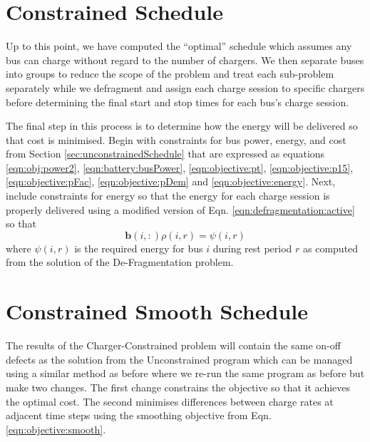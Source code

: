 \section{Constrained Schedule\label{sec:constrainedSchedule}}
Up to this point, we have computed the ``optimal'' schedule which assumes any bus can charge without regard to the number of chargers. We then separate buses into groups to reduce the scope of the problem and treat each sub-problem separately while we defragment and assign each charge session to specific chargers before determining the final start and stop times for each bus's charge session.
\par The final step in this process is to determine how the energy will be delivered so that cost is minimised. Begin with constraints for bus power, energy, and cost from Section \ref{sec:unconstrainedSchedule} that are expressed as equations \ref{eqn:obj:power2}, \ref{eqn:battery:busPower}, \ref{eqn:objective:pt}, \ref{eqn:objective:p15}, \ref{eqn:objective:pFac}, \ref{eqn:objective:pDem} and \ref{eqn:objective:energy}. Next, include constraints for energy so that the energy for each charge session is properly delivered using a modified version of Eqn. \ref{eqn:defragmentation:active} so that
\begin{equation}
	\mathbf{b}(i,:)\rho(i,r) = \psi(i,r)
\end{equation}
where $\psi(i,r)$ is the required energy for bus $i$ during rest period $r$ as computed from the solution of the De-Fragmentation problem.
\section{Constrained Smooth Schedule\label{sec:constrainedSmoothSchedule}}
 \par The results of the Charger-Constrained problem will contain the same on-off defects as the solution from the Unconstrained program which can be managed using a similar method as before where we re-run the same program as before but make two changes. The first change constrains the objective so that it achieves the optimal cost. The second minimises differences between charge rates at adjacent time steps using the smoothing objective from Eqn. \ref{eqn:objective:smooth}.
